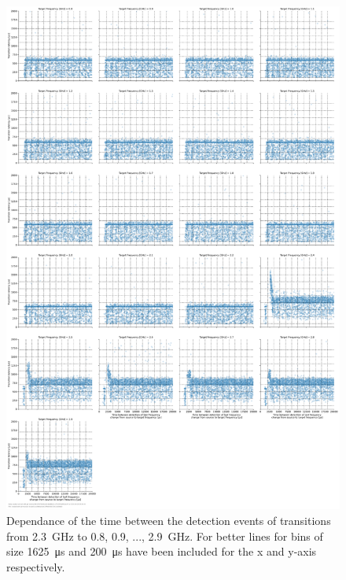 \begin{figure}[]
    \centering
    \includegraphics[width=\columnwidth]{fig/ftalat/ftalat_scatter_wait_transition_latency_hati_source_2.3.pdf}
    \caption{Dependance of the time between the detection events of transitions from \SI{2.3}{\GHz} to \SI{0.8}{}, \SI{0.9}{}, ..., \SI{2.9}{\GHz}. For better lines for bins of size \SI{1625}{\us} and \SI{200}{\us} have been included for the x and y-axis respectively.}
\end{figure}
